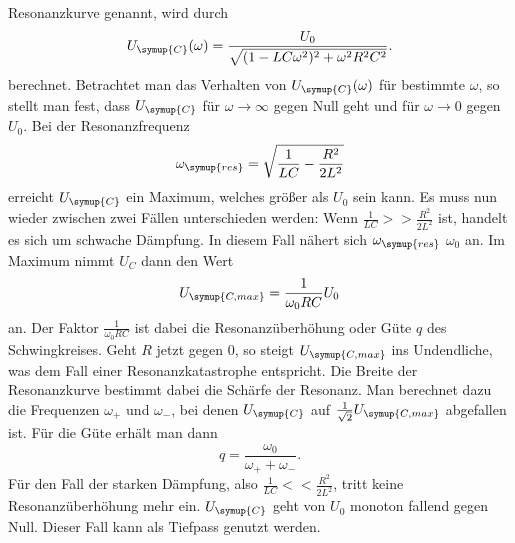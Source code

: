 Resonanzkurve genannt, wird durch
\begin{equation}
  U_\symup{C}(\omega) = \frac{U_0}{\sqrt{(1-L C \omega^2)^2 + \omega^2 R^2 C^2}}.
  \label{eqn:resonanzkurve}
\end{equation}
berechnet. Betrachtet man das Verhalten von $U_\symup{C}(\omega)$ für bestimmte
$\omega$, so stellt man fest, dass $U_\symup{C}$ für $\omega \to \infty$ gegen
Null geht und für $\omega \to 0$ gegen $U_0$. Bei der Resonanzfrequenz
\begin{equation}
  \omega_\symup{res} = \sqrt{\frac{1}{L C}-\frac{R^2}{2L^2}}
  \label{eqn:resonanzfrequenz}
\end{equation}
erreicht $U_\symup{C}$ ein Maximum, welches größer als $U_0$ sein kann.
Es muss nun wieder zwischen zwei Fällen unterschieden werden:\newline
Wenn $\frac{1}{L C} >> \frac{R^2}{2 L^2}$ ist, handelt es sich um schwache Dämpfung.
In diesem Fall nähert sich $\omega_\symup{res}$ $\omega_0$ an. Im Maximum nimmt
$U_C$ dann den Wert
\begin{equation}
  U_\symup{C,max} = \frac{1}{\omega_0 R C} U_0
  \label{eqn:Ucmax}
\end{equation}
an. Der Faktor $\frac{1}{\omega_0 R C}$ ist dabei die Resonanzüberhöhung oder
Güte $q$ des Schwingkreises. Geht $R$ jetzt gegen 0, so steigt $U_\symup{C,max}$
ins Undendliche, was dem Fall einer Resonanzkatastrophe entspricht.
Die Breite der Resonanzkurve bestimmt dabei die Schärfe der Resonanz. Man berechnet
dazu die Frequenzen $\omega_+$ und $\omega_-$, bei denen $U_\symup{C}$ auf
$\frac{1}{\sqrt{2}}U_\symup{C,max}$ abgefallen ist. Für die Güte erhält man dann
\begin{equation}
  q = \frac{\omega_0}{\omega_+ + \omega_-}.
  \label{eqn:guete}
\end{equation}
Für den Fall der starken Dämpfung, also $\frac{1}{L C} << \frac{R^2}{2 L^2}$, tritt
keine Resonanzüberhöhung mehr ein. $U_\symup{C}$ geht von $U_0$ monoton fallend
gegen Null. Dieser Fall kann als Tiefpass genutzt werden.
\cite{sample}

